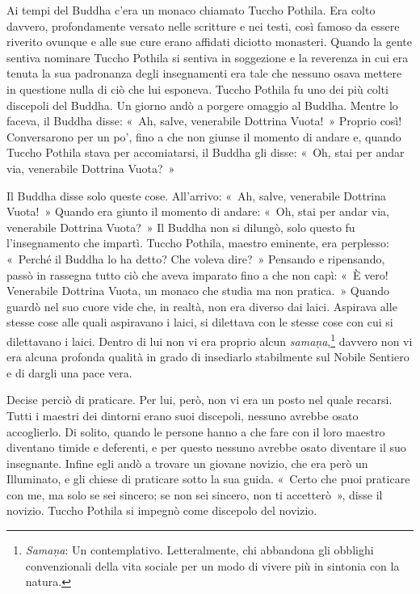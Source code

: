 Ai tempi del Buddha c'era un monaco chiamato Tuccho Pothila. Era colto
davvero, profondamente versato nelle scritture e nei testi, così famoso
da essere riverito ovunque e alle sue cure erano affidati diciotto
monasteri. Quando la gente sentiva nominare Tuccho Pothila si sentiva in
soggezione e la reverenza in cui era tenuta la sua padronanza degli
insegnamenti era tale che nessuno osava mettere in questione nulla di
ciò che lui esponeva. Tuccho Pothila fu uno dei più colti discepoli del
Buddha. Un giorno andò a porgere omaggio al Buddha. Mentre lo faceva, il
Buddha disse: «~Ah, salve, venerabile Dottrina Vuota!~» Proprio così!
Conversarono per un po', fino a che non giunse il momento di andare e,
quando Tuccho Pothila stava per accomiatarsi, il Buddha gli disse: «~Oh,
stai per andar via, venerabile Dottrina Vuota?~»

Il Buddha disse solo queste cose. All'arrivo: «~Ah, salve, venerabile
Dottrina Vuota!~» Quando era giunto il momento di andare: «~Oh, stai per
andar via, venerabile Dottrina Vuota?~» Il Buddha non si dilungò, solo
questo fu l'insegnamento che impartì. Tuccho Pothila, maestro eminente,
era perplesso: «~Perché il Buddha lo ha detto? Che voleva dire?~»
Pensando e ripensando, passò in rassegna tutto ciò che aveva imparato
fino a che non capì: «~È vero! Venerabile Dottrina Vuota, un monaco che
studia ma non pratica.~» Quando guardò nel suo cuore vide che, in
realtà, non era diverso dai laici. Aspirava alle stesse cose alle quali
aspiravano i laici, si dilettava con le stesse cose con cui si
dilettavano i laici. Dentro di lui non vi era proprio alcun
\emph{samaṇa},\footnote{\emph{Samaṇa}: Un contemplativo. Letteralmente,
  chi abbandona gli obblighi convenzionali della vita sociale per un
  modo di vivere più in sintonia con la natura.} davvero non vi era
alcuna profonda qualità in grado di insediarlo stabilmente sul Nobile
Sentiero e di dargli una pace vera.

Decise perciò di praticare. Per lui, però, non vi era un posto nel quale
recarsi. Tutti i maestri dei dintorni erano suoi discepoli, nessuno
avrebbe osato accoglierlo. Di solito, quando le persone hanno a che fare
con il loro maestro diventano timide e deferenti, e per questo nessuno
avrebbe osato diventare il suo insegnante. Infine egli andò a trovare un
giovane novizio, che era però un Illuminato, e gli chiese di praticare
sotto la sua guida. «~Certo che puoi praticare con me, ma solo se sei
sincero; se non sei sincero, non ti accetterò~», disse il novizio.
Tuccho Pothila si impegnò come discepolo del novizio.

